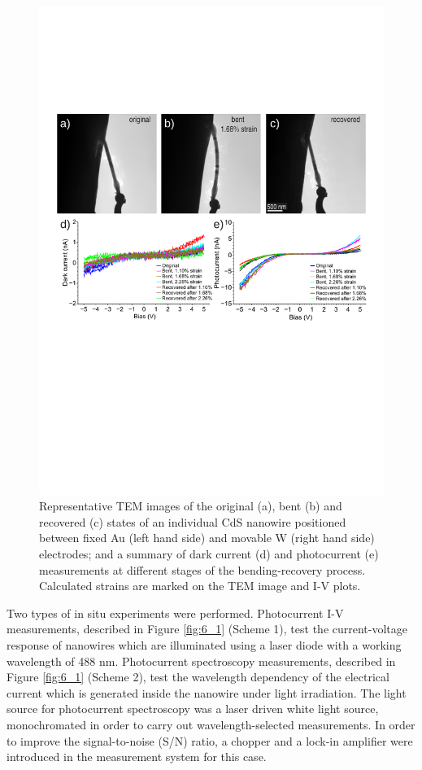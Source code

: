 \begin{figure}  
\includegraphics[width=\textwidth]{figures/figure6_2}
\caption[Deformation and I-V measurements]
{Representative TEM images of the original (a), bent (b) and recovered (c) states of an individual CdS nanowire positioned between fixed Au (left hand side) and movable W (right hand side) electrodes; and a summary of dark current (d) and photocurrent (e) measurements at different stages of the bending-recovery process. Calculated strains are marked on the TEM image and I-V plots. 
\label{fig:6_2}}
\end{figure}

Two types of in situ experiments were performed. Photocurrent I-V measurements, described in Figure \ref{fig:6_1} (Scheme 1), test the current-voltage response of nanowires which are illuminated using a laser diode with a working wavelength of 488 nm. Photocurrent spectroscopy measurements, described in Figure \ref{fig:6_1} (Scheme 2), test the wavelength dependency of the electrical current which is generated inside the nanowire under light irradiation. The light source for photocurrent spectroscopy was a laser driven white light source, monochromated in order to carry out wavelength-selected measurements. In order to improve the signal-to-noise (S/N) ratio, a chopper and a lock-in amplifier were introduced in the measurement system for this case. \\

